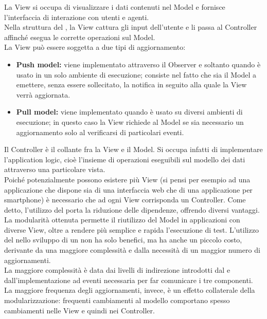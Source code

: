 				La View si occupa di visualizzare i dati contenuti nel Model e fornisce l'interfaccia di interazione con utenti e agenti.\\
				Nella struttura del  , la View cattura gli input dell'utente e li passa al Controller affinché esegua le corrette operazioni sul Model. \\
				La View può essere soggetta a due tipi di aggiornamento:
				\begin{itemize}
					\item \textbf{Push model:} viene implementato attraverso il  Observer e soltanto quando  è usato in un solo ambiente di esecuzione; consiste nel fatto che sia il Model a emettere, senza essere sollecitato, la notifica in seguito alla quale la View verrà aggiornata.
					\item \textbf{Pull model:} viene implementato quando  è usato su diversi ambienti di esecuzione; in questo caso la View richiede al Model se sia necessario un aggiornamento solo al verificarsi di particolari eventi.
				\end{itemize}
				Il Controller è il collante fra la View e il Model. Si occupa infatti di implementare l'application logic, cioè l'insieme di operazioni eseguibili sul modello dei dati attraverso una particolare vista.\\
				Poiché potenzialmente possono esistere più View (si pensi per esempio ad una applicazione che dispone sia di una interfaccia web che di una applicazione per smartphone) è necessario che ad ogni View corrisponda un Controller.
			Come detto, l'utilizzo del   porta la riduzione delle dipendenze, offrendo diversi vantaggi. La modularità ottenuta permette il riutilizzo del Model in applicazioni con diverse View, oltre a rendere più semplice e rapida l'esecuzione di test. 
			L'utilizzo del   nello sviluppo di un  non ha solo benefici, ma ha anche un piccolo costo, derivante da una maggiore complessità e dalla necessità di un maggior numero di aggiornamenti.\\
  			La maggiore complessità è data dai livelli di indirezione introdotti dal  e dall'implementazione ad eventi necessaria per far comunicare i tre componenti. La maggiore frequenza degli aggiornamenti, invece, è un effetto collaterale della modularizzazione: frequenti cambiamenti al modello comportano spesso cambiamenti nelle View e quindi nei Controller.
